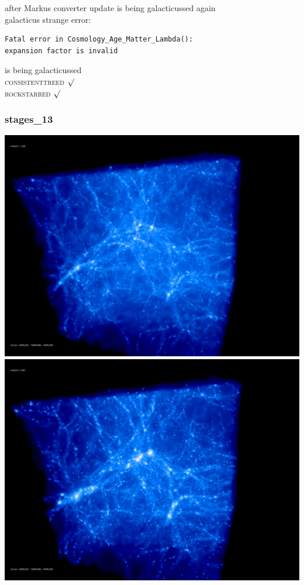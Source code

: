 after Markus converter update 
is being galacticussed again \\
galacticus strange error: 
\begin{verbatim}
Fatal error in Cosmology_Age_Matter_Lambda():
expansion factor is invalid
\end{verbatim}
is being galacticussed \\
\textsc{consistenttreed} $\surd$ \\ 
\textsc{rockstarred} $\surd$

% 
%
%
%
%
%
%
%

\newpage
\subsubsection{stages\_13}

\includegraphics[scale=0.1]{r256/h100/stages_13/50.jpg} 
\includegraphics[scale=0.1]{r256/h100/stages_13/100.jpg}  \\

